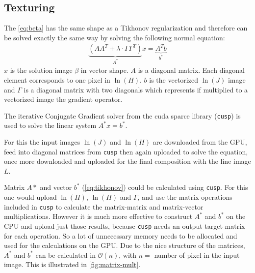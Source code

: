 \subsection{Texturing}
The \autoref{eq:beta} has the same shape as a Tikhonov regularization and
therefore can be solved exactly the same way by solving the following normal
equation:
\begin{align}
  \underbrace{(A A^T + \lambda \cdot \Gamma \Gamma^T)}_{A^*} x = \underbrace{A^T
  b}_{b^*}
  \label{eq:tikhonov}
\end{align}
$x$ is the solution image $\beta$ in vector shape. $A$ is a diagonal matrix.
Each diagonal element corresponds to one pixel in $\ln(H)$. $b$ is the
vectorized $\ln(J)$ image and $\Gamma$ is a diagonal matrix with two diagonals
which represents if multiplied to a vectorized image the gradient operator.

The iterative Conjugate Gradient solver from the cuda sparce library
(\texttt{cusp}) is used to solve the linear system $A^* x = b^*$.

For this the input images $\ln(J)$ and $\ln(H)$ are downloaded from the GPU,
feed into diagonal matrices from \texttt{cusp} then again uploaded to solve the
equation, once more downloaded and uploaded for the final composition with the
line image $L$.

Matrix $A*$ and vector $b^*$ (\autoref{eq:tikhonov}) could be calculated using
\texttt{cusp}. For this one would upload $\ln(H)$, $\ln(H)$ and $\Gamma$, and
use the matrix operations included in \texttt{cusp} to calculate the
matrix-matrix and matrix-vector multiplications. However it is much more
effective to construct $A^*$ and $b^*$ on the CPU and upload just those results,
because \texttt{cusp} needs an output target matrix for each operation. So a lot
of unnecessary memory needs to be allocated and used for the calculations on the
GPU.  Due to the nice structure of the matrices, $A^*$ and $b^*$  can be
calculated in $\mathcal{O}(n)$, with $n =$ number of pixel in the input image.
This is illustrated in \autoref{fig:matrix-mult}.

